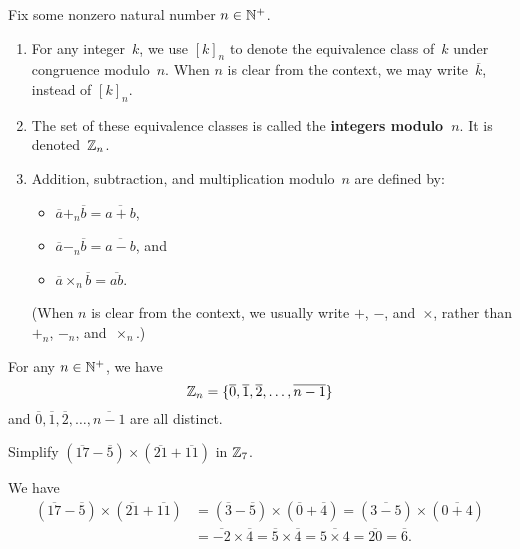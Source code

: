 \documentclass[../MATH-2000-Notes.tex]{subfiles}
\begin{document}
\begin{Definition}
    {}
    Fix some nonzero natural number $n \in \mathbb{N}^+$.
    \begin{enumerate}
        \item For any integer~$k$, we use $[k]_n$ to denote the equivalence class of~$k$ under congruence modulo~$n$. When $n$ is clear from the context, we may write~$\overline{k}$, instead of $[k]_n$.
        \item The set of these equivalence classes is called the \textbf{integers modulo~$n$}. It is denoted~$\mathbb{Z}_n$.
        \item Addition, subtraction, and multiplication modulo~$n$ are defined by:
              \begin{itemize}
                  \item $\overline{a} \mathbin{+_n} \overline{b} = \overline{a + b}$,
                  \item $\overline{a} \mathbin{-_n} \overline{b} = \overline{a - b}$,
                        and
                  \item $\overline{a} \mathbin{\times_n} \overline{b} = \overline{a  b}$.
              \end{itemize}
              (When $n$ is clear from the context, we usually write $+$, $-$, and~$\times$, rather than $+_n$, $-_n$, and~$\times_n$.)
    \end{enumerate}
\end{Definition}
\begin{Proposition}
    {}
    For any $n \in \mathbb{N}^+$, we have 
	$$\mathbb{Z}_n = \{ \overline{0}, \overline{1}, \overline{2}, \ldots, \overline{n-1} \}$$
and\/ $\overline{0}, \overline{1}, \overline{2}, \ldots, \overline{n-1}$ are all distinct.
\end{Proposition}

\begin{Questions}
    \item Simplify $(\overline{17} - \overline{5}) \times (\overline{21} +\overline{11})$ in $\mathbb{Z}_7$.
\end{Questions}
\begin{Answers}
    \item We have
	\begin{align*}
	(\overline{17} - \overline{5}) \times (\overline{21} +\overline{11})
	&=(\overline{3} - \overline{5}) \times (\overline{0} +\overline{4})
	=  (\overline{3 - 5}) \times (\overline{0 + 4})
	\\&= \overline{-2} \times \overline{4}
	= \overline{5} \times \overline{4}
	= \overline{5 \times 4}
	= \overline{20}
	= \overline{6}
	. \end{align*}
\end{Answers}
\end{document}
